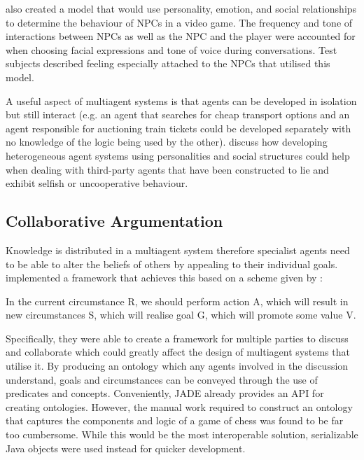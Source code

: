 \documentclass{article}
\begin{document}
\cite{skyrim} also created a model that would use personality, emotion, and social relationships to determine the behaviour of NPCs in a video game. The frequency and tone of interactions between NPCs as well as the NPC and the player were accounted for when choosing facial expressions and tone of voice during conversations. Test subjects described feeling especially attached to the NPCs that utilised this model.

A useful aspect of multiagent systems is that agents can be developed in isolation but still interact (e.g. an agent that searches for cheap transport options and an agent responsible for auctioning train tickets could be developed separately with no knowledge of the logic being used by the other). \cite{hetrogenousagents} discuss how developing heterogeneous agent systems using personalities and social structures could help when dealing with third-party agents that have been constructed to lie and exhibit selfish or uncooperative behaviour.

\subsection{Collaborative Argumentation}

Knowledge is distributed in a multiagent system therefore specialist agents need to be able to alter the beliefs of others by appealing to their individual goals. \cite{argumentation} implemented a framework that achieves this based on a scheme given by \cite{reasoning}:

\begin{displayquote}
	In the current circumstance R, we should perform action A, which will result in new circumstances S, which will realise goal G, which will promote some value V.
\end{displayquote}

Specifically, they were able to create a framework for multiple parties to discuss and collaborate which could greatly affect the design of multiagent systems that utilise it. By producing an ontology which any agents involved in the discussion understand, goals and circumstances can be conveyed through the use of predicates and concepts. Conveniently, JADE already provides an API for creating ontologies. However, the manual work required to construct an ontology that captures the components and logic of a game of chess was found to be far too cumbersome. While this would be the most interoperable solution, serializable Java objects were used instead for quicker development. 
\end{document}
